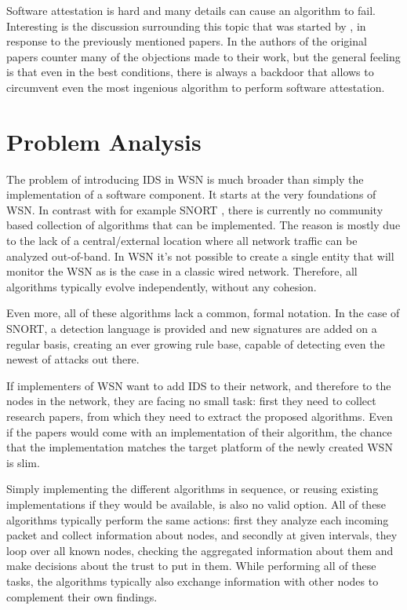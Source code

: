 \documentclass[conference]{IEEEtran}
\begin{document}
Software attestation is hard and many details can cause an algorithm to fail.
Interesting is the discussion surrounding this topic that was started by
\cite{castelluccia2009difficulty}, in response to the previously mentioned
papers. In \cite{perrig2010refutation} the authors of the original papers
counter many of the objections made to their work, but the general feeling is
that even in the best conditions, there is always a backdoor that allows to
circumvent even the most ingenious algorithm to perform software attestation.

\section{Problem Analysis}
\label{section:problem}

The problem of introducing IDS in WSN is much broader than simply the
implementation of a software component. It starts at the very foundations of
WSN. In contrast with for example SNORT \cite{roesch1999snort}, there is
currently no community based collection of algorithms that can be implemented.
The reason is mostly due to the lack of a central/external location where all
network traffic can be analyzed out-of-band. In WSN it's not possible to create
a single entity that will monitor the WSN as is the case in a classic wired
network. Therefore, all algorithms typically evolve independently, without any
cohesion.

Even more, all of these algorithms lack a common, formal notation. In the case
of SNORT, a detection language is provided and new signatures are added on a
regular basis, creating an ever growing rule base, capable of detecting even
the newest of attacks out there.

If implementers of WSN want to add IDS to their network, and therefore to the
nodes in the network, they are facing no small task: first they need to collect
research papers, from which they need to extract the proposed algorithms. Even
if the papers would come with an implementation of their algorithm, the chance
that the implementation matches the target platform of the newly created WSN is
slim.

Simply implementing the different algorithms in sequence, or reusing existing
implementations if they would be available, is also no valid option. All of
these algorithms typically perform the same actions: first they analyze each
incoming packet and collect information about nodes, and secondly at given
intervals, they loop over all known nodes, checking the aggregated information
about them and make decisions about the trust to put in them. While performing
all of these tasks, the algorithms typically also exchange information with
other nodes to complement their own findings.
\end{document}
